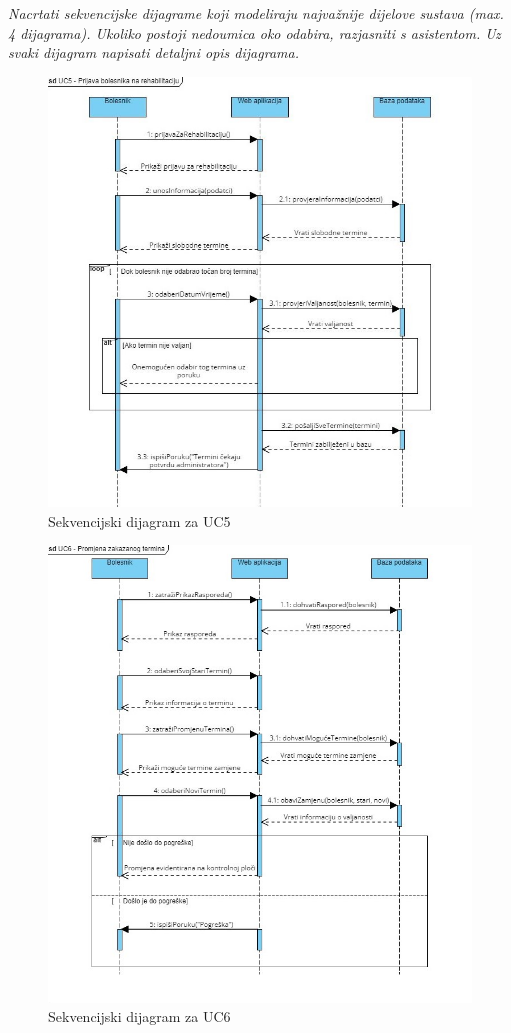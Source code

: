 \textit{Nacrtati sekvencijske dijagrame koji modeliraju najvažnije dijelove sustava (max. 4 dijagrama). Ukoliko postoji nedoumica oko odabira, razjasniti s asistentom. Uz svaki dijagram napisati detaljni opis dijagrama.}
\begin{figure}[h]
    \centering
    \includegraphics[width=\textwidth]{./slike/Sekvencijski - UC5.jpg} 
    \caption{Sekvencijski dijagram za UC5}
    \label{fig:my_image}
\end{figure}
\begin{figure}[p]
    \centering
    \includegraphics[width=\textwidth]{./slike/Sekvencijski - UC6.jpg} 
    \caption{Sekvencijski dijagram za UC6}
    \label{fig:my_image}
\end{figure}

